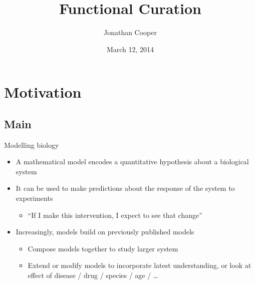 \documentclass[t,xcolor={usenames,dvipsnames}]{beamer}
\title{Functional Curation}
\author{Jonathan Cooper}
\institute[University of Oxford]
{Computational Biology Group\\
 Department of Computer Science\\
 University of Oxford}
\date{March 12, 2014}
\newcommand{\subitem}[1]{\begin{itemize}[<.->]\item #1 \end{itemize}}
\begin{document}
\begin{frame}
\titlepage
\end{frame}

\section{Motivation}
\subsection*{Main}

\begin{frame}{Modelling biology}
\begin{itemize}
\item A mathematical model encodes a quantitative hypothesis about a biological system
\item It can be used to make predictions about the response of the system to experiments
  \subitem{``If I make this intervention, I expect to see that change''}
\item Increasingly, models build on previously published models
  \begin{itemize}
  \item Compose models together to study larger system
  \item Extend or modify models to incorporate latest understanding, or look at effect of disease / drug / species / age / \ldots
  \end{itemize}
\end{itemize}
\end{frame}
\end{document}
